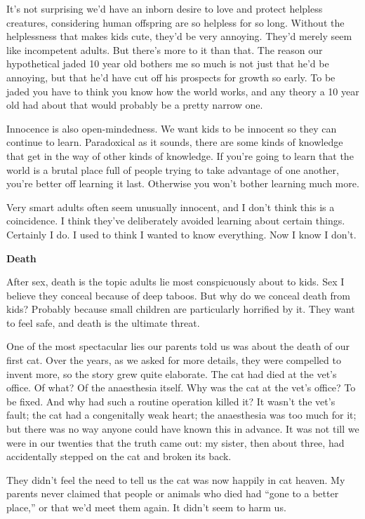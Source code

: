 It's not surprising we'd have an inborn desire to love and protect
helpless creatures, considering human offspring are so helpless for so
long. Without the helplessness that makes kids cute, they'd be very
annoying. They'd merely seem like incompetent adults. But there's more
to it than that. The reason our hypothetical jaded 10 year old bothers
me so much is not just that he'd be annoying, but that he'd have cut off
his prospects for growth so early. To be jaded you have to think you
know how the world works, and any theory a 10 year old had about that
would probably be a pretty narrow one.

Innocence is also open-mindedness. We want kids to be innocent so they
can continue to learn. Paradoxical as it sounds, there are some kinds of
knowledge that get in the way of other kinds of knowledge. If you're
going to learn that the world is a brutal place full of people trying to
take advantage of one another, you're better off learning it last.
Otherwise you won't bother learning much more.

Very smart adults often seem unusually innocent, and I don't think this
is a coincidence. I think they've deliberately avoided learning about
certain things. Certainly I do. I used to think I wanted to know
everything. Now I know I don't.

\textbf{Death}

After sex, death is the topic adults lie most conspicuously about to
kids. Sex I believe they conceal because of deep taboos. But why do we
conceal death from kids? Probably because small children are
particularly horrified by it. They want to feel safe, and death is the
ultimate threat.

One of the most spectacular lies our parents told us was about the death
of our first cat. Over the years, as we asked for more details, they
were compelled to invent more, so the story grew quite elaborate. The
cat had died at the vet's office. Of what? Of the anaesthesia itself.
Why was the cat at the vet's office? To be fixed. And why had such a
routine operation killed it? It wasn't the vet's fault; the cat had a
congenitally weak heart; the anaesthesia was too much for it; but there
was no way anyone could have known this in advance. It was not till we
were in our twenties that the truth came out: my sister, then about
three, had accidentally stepped on the cat and broken its back.

They didn't feel the need to tell us the cat was now happily in cat
heaven. My parents never claimed that people or animals who died had
``gone to a better place,'' or that we'd meet them again. It didn't seem
to harm us.

